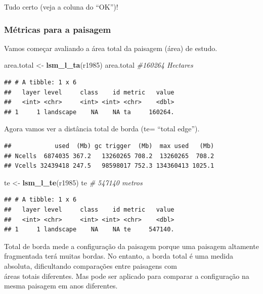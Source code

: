 \documentclass[
]{article}
\newenvironment{Shaded}{\begin{snugshade}}{\end{snugshade}}
\newcommand{\CommentTok}[1]{\textcolor[rgb]{0.56,0.35,0.01}{\textit{#1}}}
\newcommand{\FunctionTok}[1]{\textcolor[rgb]{0.13,0.29,0.53}{\textbf{#1}}}
\newcommand{\NormalTok}[1]{#1}
\newcommand{\OtherTok}[1]{\textcolor[rgb]{0.56,0.35,0.01}{#1}}
\begin{document}
Tudo certo (veja a coluna do ``OK'')!

\hypertarget{muxe9tricas-para-a-paisagem}{%
\subsubsection{Métricas para a paisagem}\label{muxe9tricas-para-a-paisagem}}

Vamos começar avaliando a área total da paisagem (área) de estudo.

\begin{Shaded}
\begin{Highlighting}[]
\NormalTok{area.total }\OtherTok{\textless{}{-}} \FunctionTok{lsm\_l\_ta}\NormalTok{(r1985) }
\NormalTok{area.total }\CommentTok{\#160264 Hectares}
\end{Highlighting}
\end{Shaded}

\begin{verbatim}
## # A tibble: 1 x 6
##   layer level     class    id metric   value
##   <int> <chr>     <int> <int> <chr>    <dbl>
## 1     1 landscape    NA    NA ta     160264.
\end{verbatim}

Agora vamos ver a distância total de borda (te= ``total
edge'').

\begin{verbatim}
##            used  (Mb) gc trigger  (Mb)  max used   (Mb)
## Ncells  6874035 367.2   13260265 708.2  13260265  708.2
## Vcells 32439418 247.5   98598017 752.3 134360413 1025.1
\end{verbatim}

\begin{Shaded}
\begin{Highlighting}[]
\NormalTok{te }\OtherTok{\textless{}{-}} \FunctionTok{lsm\_l\_te}\NormalTok{(r1985)}
\NormalTok{te }\CommentTok{\# 547140 metros}
\end{Highlighting}
\end{Shaded}

\begin{verbatim}
## # A tibble: 1 x 6
##   layer level     class    id metric   value
##   <int> <chr>     <int> <int> <chr>    <dbl>
## 1     1 landscape    NA    NA te     547140.
\end{verbatim}

Total de borda mede a configuração da paisagem porque uma paisagem
altamente fragmentada terá muitas bordas. No entanto, a borda total
é uma medida absoluta, dificultando comparações entre paisagens com\\
áreas totais diferentes. Mas pode ser aplicado para comparar a
configuração na mesma paisagem em anos diferentes.
\end{document}

